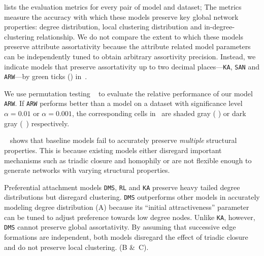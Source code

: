  lists the evaluation metrics for every pair of model
and dataset; The metrics measure the accuracy with which these models
preserve key global network properties: degree distribution, local clustering distribution
and in-degree-clustering relationship. We do not compare the extent to which these models preserve attribute assortativity because the attribute related model parameters can be independently tuned to obtain arbitrary assortivity precision. Instead, we indicate models that preserve assortativity up to two decimal
places---\texttt{KA}, \texttt{SAN} and \texttt{ARW}---by green ticks (\checkmark) in~.

We use permutation testing ~ to evaluate the relative performance of our model \texttt{ARW}. If
\texttt{ARW} performs better than a model on a dataset with significance level
$\alpha=0.01$ or $\alpha=0.001$, the corresponding cells in~
are shaded gray ( \lightgraybg{ }) or dark gray (~\darkgraybg{ }) respectively.


~ shows that baseline models fail to accurately preserve \textit{multiple} structural properties. This is because existing models either disregard important mechanisms such as triadic closure and homophily or are not flexible enough to generate networks with varying structural properties.


Preferential attachment models \texttt{DMS}, \texttt{RL}
and \texttt{KA} preserve heavy tailed degree distributions but disregard
clustering. \texttt{DMS} outperforms other models in accurately modeling
degree distribution (A) because its ``initial attractiveness''
parameter can be tuned to adjust preference towards low degree nodes. Unlike \texttt{KA}, however,
\texttt{DMS} cannot preserve global assortativity.
By assuming that successive edge formations are independent, both models disregard
the effect of triadic closure and do not preserve local clustering. (B \&~C).

